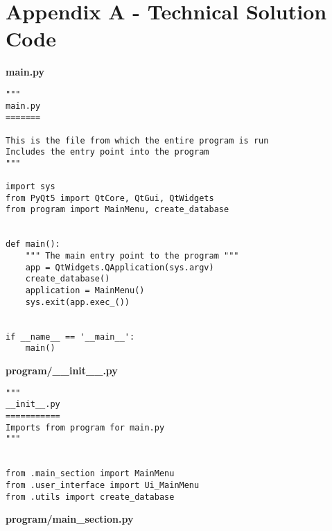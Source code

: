 \documentclass{article}
\begin{document}
\clearpage

\section{Appendix A - Technical Solution Code}

\textbf{main.py}

\begin{lstlisting}
"""
main.py
=======

This is the file from which the entire program is run
Includes the entry point into the program
"""

import sys
from PyQt5 import QtCore, QtGui, QtWidgets
from program import MainMenu, create_database


def main():
    """ The main entry point to the program """
    app = QtWidgets.QApplication(sys.argv)
    create_database()
    application = MainMenu()
    sys.exit(app.exec_())


if __name__ == '__main__':
    main()
\end{lstlisting}

\textbf{program/\_\_init\_\_.py}

\begin{lstlisting}
"""
__init__.py
===========
Imports from program for main.py
"""


from .main_section import MainMenu
from .user_interface import Ui_MainMenu
from .utils import create_database
\end{lstlisting}


\textbf{program/main\_section.py}
\end{document}
